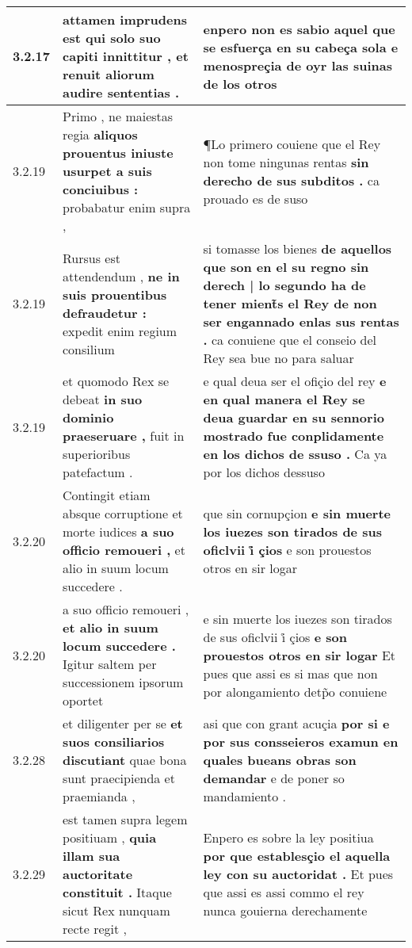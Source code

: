 \begin{tabular}{|p{1cm}|p{6.5cm}|p{6.5cm}|}
3.2.17 & attamen imprudens est \textbf{ qui solo suo capiti innittitur , } et renuit aliorum audire sententias . & enpero non es sabio aquel \textbf{ que se esfuerça en su cabeça sola } e menospreçia de oyr las suinas de los otros \\\hline
3.2.19 & Primo , ne maiestas regia \textbf{ aliquos prouentus iniuste usurpet a suis conciuibus : } probabatur enim supra , & ¶Lo primero couiene que el Rey non tome ningunas rentas \textbf{ sin derecho de sus subditos . } ca prouado es de suso \\\hline
3.2.19 & Rursus est attendendum , \textbf{ ne in suis prouentibus defraudetur : } expedit enim regium consilium & si tomasse los bienes \textbf{ de aquellos que son en el su regno sin derech | lo segundo ha de tener mient̃s el Rey de non ser engannado enlas sus rentas . } ca conuiene que el conseio del Rey sea bue no para saluar \\\hline
3.2.19 & et quomodo Rex se debeat \textbf{ in suo dominio praeseruare , } fuit in superioribus patefactum . & e qual deua ser el ofiçio del rey \textbf{ e en qual manera el Rey se deua guardar en su sennorio mostrado fue conplidamente en los dichos de ssuso . } Ca ya por los dichos dessuso \\\hline
3.2.20 & Contingit etiam absque corruptione et morte iudices \textbf{ a suo officio remoueri , } et alio in suum locum succedere . & que sin cornupçion \textbf{ e sin muerte los iuezes son tirados de sus oficlvii i̊ çios } e son prouestos otros en sir logar \\\hline
3.2.20 & a suo officio remoueri , \textbf{ et alio in suum locum succedere . } Igitur saltem per successionem ipsorum oportet & e sin muerte los iuezes son tirados de sus oficlvii i̊ çios \textbf{ e son prouestos otros en sir logar } Et pues que assi es si mas que non por alongamiento detp̃o conuiene \\\hline
3.2.28 & et diligenter per se \textbf{ et suos consiliarios discutiant } quae bona sunt praecipienda et praemianda , & asi que con grant acuçia \textbf{ por si e por sus consseieros examun en quales bueans obras son demandar } e de poner so mandamiento . \\\hline
3.2.29 & est tamen supra legem positiuam , \textbf{ quia illam sua auctoritate constituit . } Itaque sicut Rex nunquam recte regit , & Enpero es sobre la ley positiua \textbf{ por que establesçio el aquella ley con su auctoridat . } Et pues que assi es assi commo el rey nunca gouierna derechamente \\\hline

\end{tabular}

